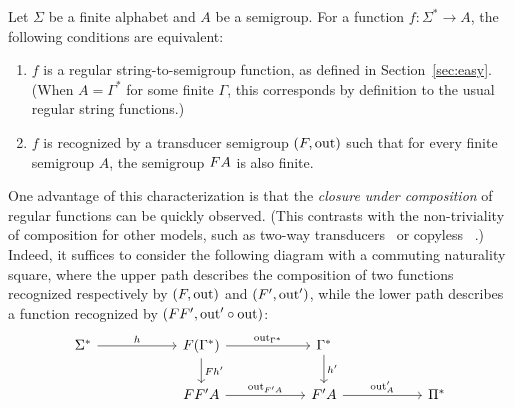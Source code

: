 
\begin{theorem}\label{thm:regular-functions}
    Let $\Sigma$ be a finite alphabet and $A$ be a semigroup. For a function $f : \Sigma^* \to A$, the following conditions are equivalent:
    \begin{enumerate}
        \item \label{it:regular} $f$ is  a regular string-to-semigroup function, as defined in Section~\ref{sec:easy}. (When $A = \Gamma^*$ for some finite $\Gamma$, this corresponds by definition to the usual regular string functions.)
        \item \label{it:trans-semig-regular}$f$ is recognized by a transducer semigroup $(\functor,\outfun)$ such that for every finite semigroup $A$, the semigroup $\functor A$ is also finite. 
    \end{enumerate}
\end{theorem}
\begin{remark}\label{rem:composition}
    One advantage of this characterization is that the \emph{closure under composition} of regular functions can be quickly observed. (This contrasts with the non-triviality of composition for other models, such as two-way transducers~\cite{ChytilJ77} or copyless \sst~\cite{composingSST}.)
    Indeed, it suffices to consider the following diagram with a commuting naturality square, where the upper path describes the composition of two functions recognized respectively by $(\functor,\outfun)$ and $(\functor',\outfun')$, while the lower path describes a function recognized by $(\functor\functor',\outfun'\circ\outfun)$:
    \[
    \begin{tikzcd}
        [column sep=2cm]
        \Sigma^* 
        \ar[r,"h"]
        & 
        \functor(\Gamma^*)
        \ar[r,"\outfun_{\Gamma^*}"]
        \ar[d,"\functor h'"]
        &
        \Gamma^* \ar[d,"h'"]\\
        &
        \functor\functor'A \ar[r,"\outfun_{\functor'A}"]
        & 
        \functor'A
        \ar[r,"\outfun'_A"]
        &
        \Pi^*
    \end{tikzcd}
    \]
\end{remark}

